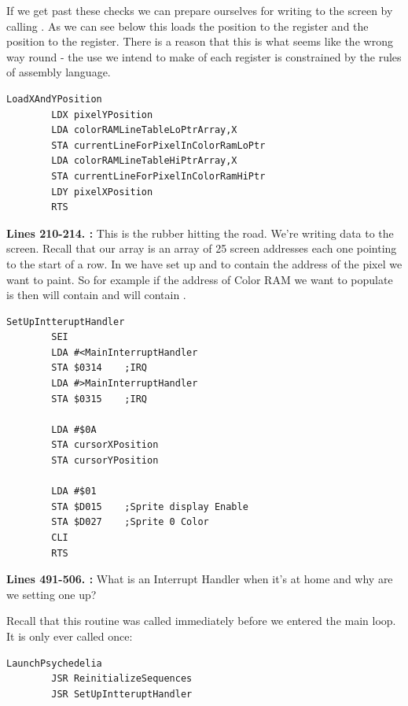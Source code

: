 {If we get past these checks we can prepare ourselves for writing to the screen by calling . As we can
see below this loads the  position to the  register and the  position to the  register. There
is a reason that this is what seems like the wrong way round - the use we intend to make of each register is constrained by the
rules of assembly language.

\begin{lstlisting}
LoadXAndYPosition   
        LDX pixelYPosition
        LDA colorRAMLineTableLoPtrArray,X
        STA currentLineForPixelInColorRamLoPtr
        LDA colorRAMLineTableHiPtrArray,X
        STA currentLineForPixelInColorRamHiPtr
        LDY pixelXPosition
        RTS 
\end{lstlisting}

\textbf{Lines 210-214. :} This is the rubber hitting the road. We're writing data to the
screen. Recall that our   array is an array of 25 screen addresses each one pointing
to the start of a row. In  we have set up  and  to contain the address of the pixel we want to paint. So for example if the address of Color RAM we want to populate
is  then  will contain  and  will
contain . 
\clearpage
\begin{lstlisting}[caption= Setting up our Interrupt Handler]
SetUpIntteruptHandler   
        SEI 
        LDA #<MainInterruptHandler
        STA $0314    ;IRQ
        LDA #>MainInterruptHandler
        STA $0315    ;IRQ

        LDA #$0A
        STA cursorXPosition
        STA cursorYPosition

        LDA #$01
        STA $D015    ;Sprite display Enable
        STA $D027    ;Sprite 0 Color
        CLI 
        RTS 
\end{lstlisting}
\clearpage
{}
\textbf{Lines 491-506. :} What is an Interrupt Handler when it's at home and why are
we setting one up?

Recall that this routine was called immediately before we entered the main loop. It is only ever called once:
\begin{lstlisting}
LaunchPsychedelia   
        JSR ReinitializeSequences
        JSR SetUpIntteruptHandler
\end{lstlisting}

}
